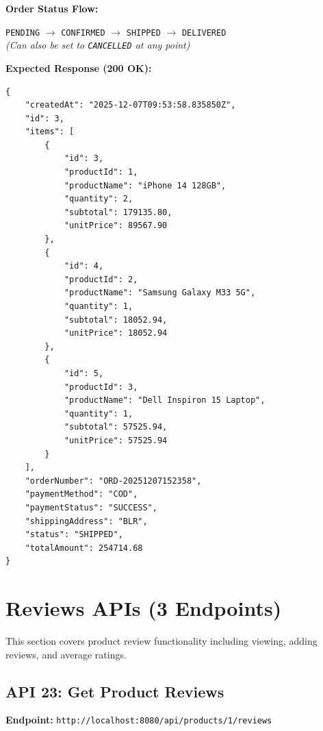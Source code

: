 \documentclass[12pt, a4paper]{article}
\begin{document}
\textbf{Order Status Flow:}
\begin{center}
\texttt{PENDING} $\rightarrow$ \texttt{CONFIRMED} $\rightarrow$ \texttt{SHIPPED} $\rightarrow$ \texttt{DELIVERED}\\[0.3cm]
\textit{(Can also be set to \texttt{CANCELLED} at any point)}
\end{center}

\textbf{Expected Response (200 OK):}
\begin{lstlisting}
{
    "createdAt": "2025-12-07T09:53:58.835850Z",
    "id": 3,
    "items": [
        {
            "id": 3,
            "productId": 1,
            "productName": "iPhone 14 128GB",
            "quantity": 2,
            "subtotal": 179135.80,
            "unitPrice": 89567.90
        },
        {
            "id": 4,
            "productId": 2,
            "productName": "Samsung Galaxy M33 5G",
            "quantity": 1,
            "subtotal": 18052.94,
            "unitPrice": 18052.94
        },
        {
            "id": 5,
            "productId": 3,
            "productName": "Dell Inspiron 15 Laptop",
            "quantity": 1,
            "subtotal": 57525.94,
            "unitPrice": 57525.94
        }
    ],
    "orderNumber": "ORD-20251207152358",
    "paymentMethod": "COD",
    "paymentStatus": "SUCCESS",
    "shippingAddress": "BLR",
    "status": "SHIPPED",
    "totalAmount": 254714.68
}
\end{lstlisting}

\newpage

\section{Reviews APIs (3 Endpoints)}

This section covers product review functionality including viewing, adding reviews, and average ratings.

\subsection{API 23: Get Product Reviews}

\begin{tcolorbox}[colback=getcolor!10, colframe=getcolor, title=GET]
\textbf{Endpoint:} \texttt{http://localhost:8080/api/products/1/reviews}
\end{tcolorbox}
\end{document}

